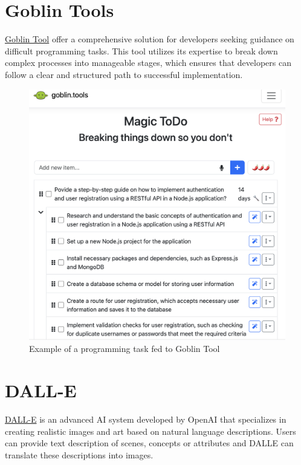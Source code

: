 \documentclass[
]{book}
\begin{document}
\hypertarget{goblin-tools}{%
\section{Goblin Tools}\label{goblin-tools}}

\href{https://goblin.tools/}{Goblin Tool} offer a comprehensive solution for developers seeking guidance on difficult programming tasks. This tool utilizes its expertise to break down complex processes into manageable stages, which ensures that developers can follow a clear and structured path to successful implementation.

\begin{figure}

{\centering \includegraphics[width=0.7\linewidth]{Goblin_Tool_Example} 

}

\caption{Example of a programming task fed to Goblin Tool}\label{fig:unnamed-chunk-14}
\end{figure}

\hypertarget{dall-e}{%
\section{DALL-E}\label{dall-e}}

\href{https://labs.openai.com/}{DALL-E} is an advanced AI system developed by OpenAI that specializes in creating realistic images and art based on natural language descriptions. Users can provide text description of scenes, concepts or attributes and DALLE can translate these descriptions into images.
\end{document}
